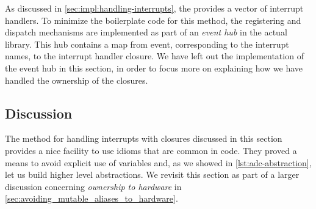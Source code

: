 As discussed in \autoref{sec:impl:handling-interrupts}, the {\gecko} provides a vector of interrupt handlers.
To minimize the boilerplate code for this method, the registering and dispatch mechanisms are implemented as part of an \emph{event hub} in the actual library.
This hub contains a map from event, corresponding to the interrupt names, to the interrupt handler closure.
We have left out the implementation of the event hub in this section, in order to focus more on explaining how we have handled the ownership of the closures.

\subsection{Discussion}

The method for handling interrupts with closures discussed in this section provides a nice facility to use idioms that are common in {\rust} code.
They proved a means to avoid explicit use of {\unsafe}  variables and, as we showed in \autoref{lst:adc-abstraction}, let us build higher level abstractions.
We revisit this section as part of a larger discussion concerning \emph{ownership to hardware} in \autoref{sec:avoiding_mutable_aliases_to_hardware}.


